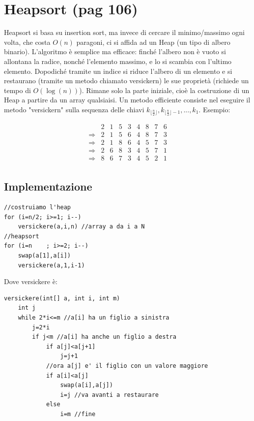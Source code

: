 \documentclass[a4paper]{book}
\begin{document}
\section{Heapsort (pag 106)}
Heapsort si basa su insertion sort, ma invece di cercare il minimo/massimo ogni volta, che costa $O(n)$ paragoni, ci si affida ad un Heap (un tipo di albero binario). L'algoritmo è semplice ma efficace: finché l'albero non è vuoto si allontana la radice, nonché l'elemento massimo, e lo si scambia con l'ultimo elemento. Dopodiché tramite un indice si riduce l'albero di un elemento e si restaurano (tramite un metodo chiamato versickern) le sue proprietà (richiede un tempo di $O(\log (n))$). Rimane solo la parte iniziale, cioè la costruzione di un Heap a partire da un array qualsiaisi. Un metodo efficiente consiste nel eseguire il metodo "versickern" sulla sequenza delle chiavi $k_{\lfloor \frac{n}{2} \rfloor}, k_{\lfloor \frac{n}{2} \rfloor - 1}, ... , k_1$. Esempio:

\[\begin{array}{*{20}{c}}
{}&{2}&1&{5}&{3}&4&8&7&6\\
{\Rightarrow}&2&{1}&{5}&{6}&4&8&7&3\\
{\Rightarrow}&2&{1}&{8}&{6}&4&5&7&3\\
{\Rightarrow}&2&{6}&{8}&3&{4}&5&7&1\\
{\Rightarrow}&8&{6}&7&{3}&{4}&5&2&1\\
\end{array}\]

\subsection*{Implementazione}
\begin{lstlisting}
//costruiamo l'heap
for (i=n/2; i>=1; i--)
	versickere(a,i,n) //array a da i a N
//heapsort	
for (i=n	; i>=2; i--)
	swap(a[1],a[i])
	versickere(a,1,i-1)
\end{lstlisting}                                                                          
Dove versickere è:
\begin{lstlisting}
versickere(int[] a, int i, int m)
	int j
	while 2*i<=m //a[i] ha un figlio a sinistra
		j=2*i
		if j<m //a[i] ha anche un figlio a destra
			if a[j]<a[j+1]
				j=j+1
			//ora a[j] e' il figlio con un valore maggiore
			if a[i]<a[j]
				swap(a[i],a[j])
				i=j //va avanti a restaurare
			else
				i=m //fine		
\end{lstlisting}                                                                                                 
\end{document}
